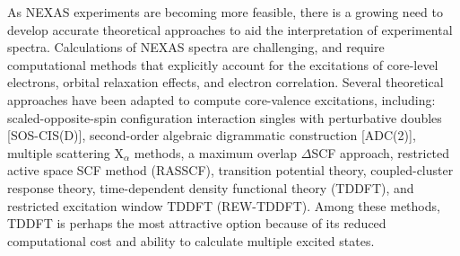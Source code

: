 \documentclass[12pt]{article}
\begin{document}
As NEXAS experiments are becoming more feasible, there is a growing need to develop accurate theoretical approaches to aid the interpretation of experimental spectra.
Calculations of NEXAS spectra are challenging, and require computational methods that explicitly account for the excitations of core-level electrons, orbital relaxation effects, and electron correlation. \cite{coriani_coupled-cluster_2012} Several theoretical approaches have been adapted to compute core-valence excitations, including: scaled-opposite-spin configuration interaction singles with perturbative doubles [SOS-CIS(D)],\cite{asmuruf_calculation_2008} second-order algebraic digrammatic construction [ADC(2)],\cite{schirmer_beyond_1982,trofimov_efficient_1995} multiple scattering X$_\alpha$ methods, \cite{sheehy_correlation_1989} a maximum overlap $\Delta$SCF approach, \cite{besley_self-consistent-field_2009} restricted active space SCF method (RASSCF), \cite{agren_relaxation_1993} transition potential theory,\cite{triguero_calculations_1998} coupled-cluster response theory, \cite{coriani_coupled-cluster_2012} time-dependent density functional theory (TDDFT),\cite{stener_time_2003} and restricted excitation window TDDFT (REW-TDDFT). \cite{lopata_linear-response_2012} Among these methods, TDDFT is perhaps the most attractive option because of its reduced computational cost and ability to calculate multiple excited states.
\end{document}
